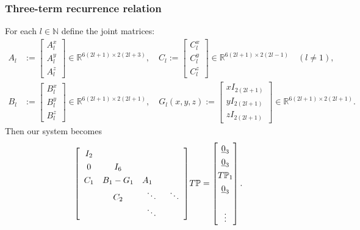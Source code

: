 \documentclass[10pt]{beamer}
\newcommand{\R}{\mathbb{R}}
\newcommand{\N}{\mathbb{N}}
\newcommand{\gradP}{T\mathbb{P}}
\begin{document}
\frame
{
    \frametitle{Three-term recurrence relation}

For each \(l \in \N\) define the joint matrices:
\begin{align}
A_l &:= \begin{bmatrix}
		A^x_l \\
		A^y_l \\
		A^z_l
	    \end{bmatrix} \in \R^{6(2l+1)\times2(2l+3)}, \quad
C_l := \begin{bmatrix}
		C^x_l \\
		C^y_l \\
		C^z_l
	    \end{bmatrix} \in \R^{6(2l+1)\times2(2l-1)} \quad (l \ne 1), \\
B_l &:= \begin{bmatrix}
		B^x_l \\
		B^y_l \\
		B^z_l
	    \end{bmatrix} \in \R^{6(2l+1)\times2(2l+1)}, \quad
G_l(x,y,z) := \begin{bmatrix}
		xI_{2(2l+1)} \\
		yI_{2(2l+1)} \\
		zI_{2(2l+1)}
	    \end{bmatrix} \in \R^{6(2l+1)\times2(2l+1)}.
\end{align}
Then our system becomes
\begin{align}
\renewcommand\arraystretch{1.3}
\mleft[
\begin{array}{cccc}
		I_2 \\
		0 & I_6 & & \\
		C_1 & B_1-G_1 & A_1 \quad & \\
		& C_2 & \ddots & \ddots \\
		& & \ddots &
\end{array}
\mright]
\gradP
=
\begin{bmatrix}
	\underline{0}_3 \\ \underline{0}_3 \\ \gradP_1 \\ \underline{0}_3 \\ \\ \vdots \\
\end{bmatrix}.
\end{align}

}
\end{document}
